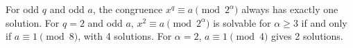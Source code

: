 For odd $q$ and odd $a$, the congruence $x^q \equiv a \pmod{2^\alpha}$ always has exactly one solution. For $q = 2$ and odd $a$, $x^2 \equiv a \pmod{2^\alpha}$ is solvable for $\alpha \geq 3$ if and only if $a \equiv 1 \pmod{8}$, with 4 solutions. For $\alpha = 2$, $a \equiv 1 \pmod{4}$ gives 2 solutions.
